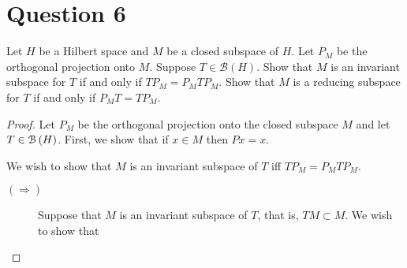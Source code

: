 \section{Question 6}
\horz

Let $H$ be a Hilbert space and $M$ be a closed subspace of $H$. Let $P_M$ be the orthogonal projection onto $M.$ Suppose $T\in \mathcal B(H).$ Show that $M$ is an invariant subspace for $T$ if and only if $TP_M = P_MTP_M.$ Show that $M$ is a reducing subspace for $T$ if and only if $P_MT=TP_M.$

\horz

\begin{proof}
    Let $P_{M}$ be the orthogonal projection onto the closed subspace $M$ and let $T\in {\cal B} \left( H \right)$. First, we show that if $x \in M$ then $Px =x$.

    We wish to show that $M$ is an invariant subspace of $T$ iff $TP_{M}=P_{M}TP_{M}$.

    \begin{description}
	\item[$\left( \Longrightarrow \right)$] Suppose that $M$ is an invariant subspace of $T$, that is, $TM \subset M$. We wish to show that 
    \end{description}
\end{proof}
